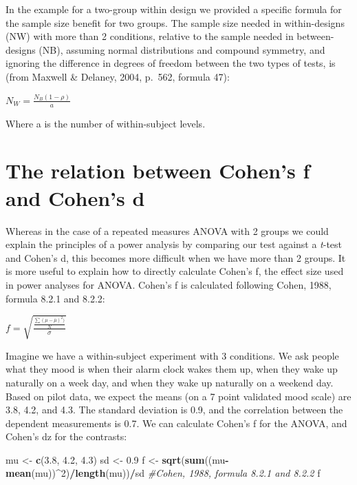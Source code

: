 \documentclass[]{book}
\newenvironment{Shaded}{\begin{snugshade}}{\end{snugshade}}
\newcommand{\CommentTok}[1]{\textcolor[rgb]{0.56,0.35,0.01}{\textit{#1}}}
\newcommand{\DecValTok}[1]{\textcolor[rgb]{0.00,0.00,0.81}{#1}}
\newcommand{\FloatTok}[1]{\textcolor[rgb]{0.00,0.00,0.81}{#1}}
\newcommand{\KeywordTok}[1]{\textcolor[rgb]{0.13,0.29,0.53}{\textbf{#1}}}
\newcommand{\NormalTok}[1]{#1}
\newcommand{\OperatorTok}[1]{\textcolor[rgb]{0.81,0.36,0.00}{\textbf{#1}}}
\newcommand{\StringTok}[1]{\textcolor[rgb]{0.31,0.60,0.02}{#1}}
\begin{document}
In the example for a two-group within design we provided a specific formula for the sample size benefit for two groups. The sample size needed in within-designs (NW) with more than 2 conditions, relative to the sample needed in between-designs (NB), assuming normal distributions and compound symmetry, and ignoring the difference in degrees of freedom between the two types of tests, is (from Maxwell \& Delaney, 2004, p.~562, formula 47):

\(N_{W}=\frac{N_{B}(1-\rho)}{a}\)

Where a is the number of within-subject levels.

\hypertarget{the-relation-between-cohens-f-and-cohens-d}{%
\section{The relation between Cohen's f and Cohen's d}\label{the-relation-between-cohens-f-and-cohens-d}}

Whereas in the case of a repeated measures ANOVA with 2 groups we could explain the principles of a power analysis by comparing our test against a \emph{t}-test and Cohen's d, this becomes more difficult when we have more than 2 groups. It is more useful to explain how to directly calculate Cohen's f, the effect size used in power analyses for ANOVA. Cohen's f is calculated following Cohen, 1988, formula 8.2.1 and 8.2.2:

\(f = \sqrt{\frac{\frac{\sum(\mu-\overline{\mu})^2)}N}\sigma}\)

Imagine we have a within-subject experiment with 3 conditions. We ask people what they mood is when their alarm clock wakes them up, when they wake up naturally on a week day, and when they wake up naturally on a weekend day. Based on pilot data, we expect the means (on a 7 point validated mood scale) are 3.8, 4.2, and 4.3. The standard deviation is 0.9, and the correlation between the dependent measurements is 0.7. We can calculate Cohen's f for the ANOVA, and Cohen's dz for the contrasts:

\begin{Shaded}
\begin{Highlighting}[]
\NormalTok{mu <-}\StringTok{ }\KeywordTok{c}\NormalTok{(}\FloatTok{3.8}\NormalTok{, }\FloatTok{4.2}\NormalTok{, }\FloatTok{4.3}\NormalTok{)}
\NormalTok{sd <-}\StringTok{ }\FloatTok{0.9}
\NormalTok{f <-}\StringTok{ }\KeywordTok{sqrt}\NormalTok{(}\KeywordTok{sum}\NormalTok{((mu}\OperatorTok{-}\KeywordTok{mean}\NormalTok{(mu))}\OperatorTok{^}\DecValTok{2}\NormalTok{)}\OperatorTok{/}\KeywordTok{length}\NormalTok{(mu))}\OperatorTok{/}\NormalTok{sd }\CommentTok{#Cohen, 1988, formula 8.2.1 and 8.2.2}
\NormalTok{f}
\end{Highlighting}
\end{Shaded}
\end{document}
